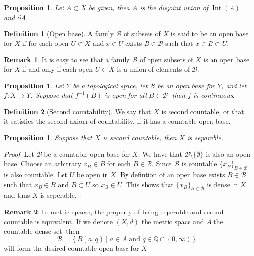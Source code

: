 \documentclass[11pt,a4paper]{article}
\theoremstyle{definition}
\newtheorem{definition}{Definition}[section]
\newtheorem{remark}{Remark}[section]
\theoremstyle{plain}
\newtheorem{proposition}[theorem]{Proposition}
\DeclareMathOperator{\Int}{Int}
\newcommand{\Q}{\mathbb{Q}}
\newcommand{\set}[2]{ \left\{ #1 \mid #2 \right\} }
\begin{document}
  \begin{proposition}
    Let $A \subset X$ be given, then $\overline A$ is the disjoint union of 
    $\Int(A)$ and $\partial A$.
  \end{proposition}

  \begin{definition}[Open base]
    A family $\mathcal{B}$ of subsets of $X$ is said to be an open base
    for $X$ if for each open $U \subset X$ and $x \in U$ exists 
    $B \in \mathcal{B}$ such that $x \in B \subset U$.
  \end{definition}

  \begin{remark}
    It is easy to see that a family $\mathcal{B}$ of open subsets of $X$ is an 
    open base for $X$ if and only if each open $U \subset X$ is a union of 
    elements of $\mathcal{B}$.
  \end{remark}

  \begin{proposition}\label{prp:base-continuity}
    Let $Y$ be a topological space, let $\mathcal B$ be an open base for $Y$, 
    and let $f \colon X \to Y$. 
    Suppose that $f^{-1}(B)$ is open for all $B \in \mathcal B$,
    then $f$ is continuous.
  \end{proposition}

  \begin{definition}[Second countability]
    We say that $X$ is second countable, or that it satisfies the second
    axiom of countability, if it has a countable open base.
  \end{definition}

  \begin{proposition}
    Suppose that $X$ is second countable, then $X$ is separable.
  \end{proposition}

  \begin{proof}
    Let $\mathcal{B}$ be a countable open base for $X$. We have that 
    $\mathcal{B} \setminus \{\emptyset\}$ is also an open base. Choose
    an arbitrary $x_B \in B$ for each $B \in \mathcal{B}$. Since 
    $\mathcal{B}$ is countable $\{x_B\}_{B \in \mathcal{B}}$ is also 
    countable. Let $U$ be open in $X$. By defintion of an open base exists 
    $B \in \mathcal{B}$ such that $x_B \in B$ and $B \subset U$ so 
    $x_B \in U$. This shows that $\{x_B\}_{B \in \mathcal{B}}$ is dense
    in $X$ and thus $X$ is seperable.
  \end{proof}

  \begin{remark}
    In metric spaces, the property of being seperable and second countable
    is equivalent. If we denote $(X,d)$ the metric space and $A$ the 
    countable dense set, then
    \[
      \mathcal{B} = \set{B(a,q)}{a \in A \text{ and } q \in \Q \cap 
      (0,\infty)}
    \]
    will form the desired countable open base for $X$.
  \end{remark}
\end{document}
